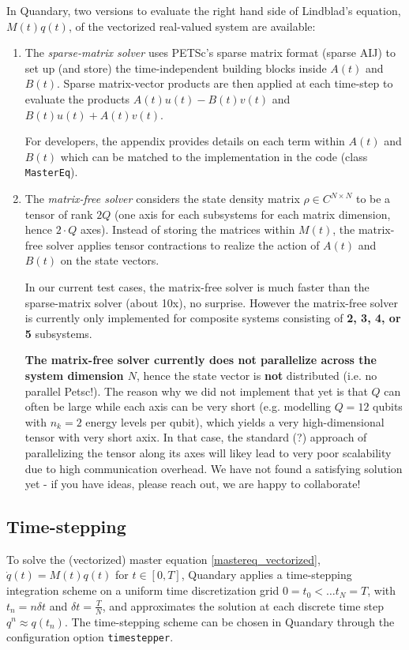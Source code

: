 \documentclass[11pt]{article}
\begin{document}
   In Quandary, two versions to evaluate the right hand side of Lindblad's
   equation, $M(t)q(t)$, of the vectorized real-valued system are available: 
   \begin{enumerate}
     \item The \textit{sparse-matrix solver} uses PETSc's sparse matrix format (sparse AIJ) to set up (and store) the time-independent building blocks inside $A(t)$ and $B(t)$. Sparse matrix-vector products are then applied at each time-step to evaluate the products $A(t)u(t) - B(t) v(t)$ and $B(t)u(t) + A(t)v(t)$.  
     
     For developers, the appendix provides details on each term within $A(t)$ and $B(t)$ which can be matched to the implementation in the code (class \texttt{MasterEq}). 

     \item The \textit{matrix-free solver} considers the state density matrix $\rho\in C^{N\times N}$ to be a tensor of rank $2Q$ (one axis for each subsystems for each matrix dimension, hence $2\cdot Q$ axes). Instead of storing the matrices within $M(t)$, the matrix-free solver applies tensor contractions to realize the action of $A(t)$ and $B(t)$ on the state vectors. 

    In our current test cases, the matrix-free solver is much faster than the sparse-matrix solver (about 10x), no surprise. However the matrix-free solver is currently only implemented for composite systems consisting of \textbf{2, 3, 4, or 5} subsystems. 

    \textbf{The matrix-free solver currently does not parallelize across the system dimension $N$}, hence the state vector is \textbf{not} distributed (i.e. no parallel Petsc!). The reason why we did not implement that yet is that $Q$ can often be large while each axis can be very short (e.g. modelling $Q=12$ qubits with $n_k=2$ energy levels per qubit), which yields a very high-dimensional tensor with very short axix. In that case, the standard (?) approach of parallelizing the tensor along its axes will likey lead to very poor scalability due to high communication overhead. We have not found a satisfying solution yet - if you have ideas, please reach out, we are happy to collaborate! 
   \end{enumerate} 


    \subsection{Time-stepping}
    To solve the (vectorized) master equation \eqref{mastereq_vectorized}, $\dot
    q(t) = M(t) q(t)$ for $t\in [0,T]$, Quandary applies a time-stepping integration
    scheme on a uniform time discretization grid $0=t_0 < \dots t_{N} = T$, with
    $t_n = n \delta t$ and $\delta t = \frac{T}{N}$, and approximates the
    solution at each discrete time step $q^{n} \approx q(t_n)$. The time-stepping scheme can be chosen in Quandary through the configuration option \texttt{timestepper}. 
    
\end{document}
